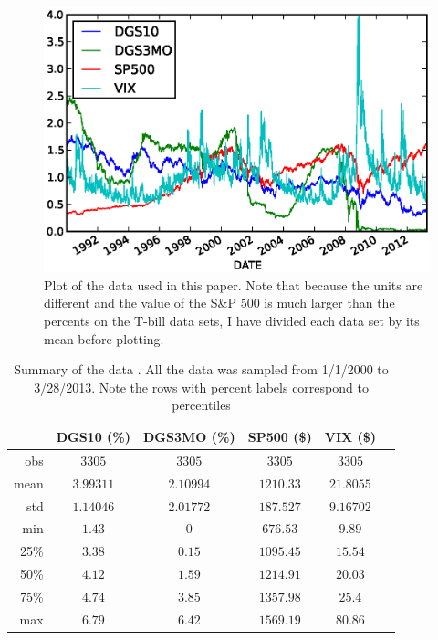 \documentclass[a4paper, 11pt]{article}
\theoremstyle{definition} %
\numberwithin{equation}{section}
\begin{document}
    \begin{figure}[ht]
        \centering
        \includegraphics[width=6in]{./Figures/all_data.eps}
        \captionsetup{width=5.5in}
        \caption{\small Plot of the data used in this paper. Note that because the units are different and the value of the S\&P 500 is much larger than the percents on the T-bill data sets, I have divided each data set by its mean before plotting.}
        \label{fig:alldata}
    \end{figure}

    \begin{table}[ht!]
      \begin{center}
        \begin{tabular}{r|ccccc}
        \hline
           \rowcolor{gray!45}  & DGS10  (\%)& DGS3MO  (\%)& SP500 (\$)& VIX (\$)\\
          \hline
          \hline
          \rowcolor{gray!7} obs & $3305$ & $3305$ & $3305$ & $3305$\\
          \rowcolor{gray!23} mean & $3.99311$ & $2.10994$ & $1210.33$ & $21.8055$\\
          \rowcolor{gray!7} std & $1.14046$ & $2.01772$ & $187.527$ & $9.16702$\\
          \rowcolor{gray!23} min & $1.43$ & $0$ & $676.53$ & $9.89$\\
          \rowcolor{gray!7} 25\% & $3.38$ & $0.15$ & $1095.45$ & $15.54$\\
          \rowcolor{gray!23} 50\% & $4.12$ & $1.59$ & $1214.91$ & $20.03$\\
          \rowcolor{gray!7} 75\% & $4.74$ & $3.85$ & $1357.98$ & $25.4$\\
          \rowcolor{gray!23} max & $6.79$ & $6.42$ & $1569.19$ & $80.86$\\
        \bottomrule
        \end{tabular}
        \captionsetup{width=5.5in}
        \caption{\small Summary of the data . All the data was sampled from 1/1/2000 to 3/28/2013. Note the rows with percent labels correspond to percentiles}
        \label{tab:describe}
      \end{center}
    \end{table}
\end{document}
